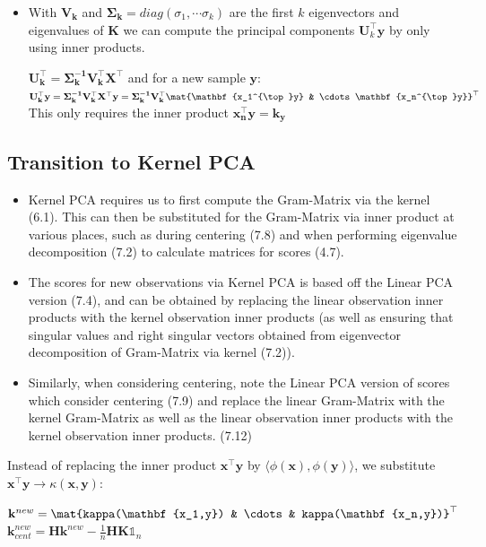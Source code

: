 \documentclass[english]{latex4ei/latex4ei_sheet}
\begin{document}
\begin{sectionbox}
\begin{itemize}
\begin{emphbox}
\end{emphbox}
\item With $\mathbf{V_k}$ and $\mathbf{\Sigma_k}=diag(\sigma_1, \cdots\sigma_k)$ are the first $k$ eigenvectors and eigenvalues of $\mathbf{K}$ we can compute the principal components $\mathbf{U}^{\top}_k\mathbf{y}$ by only using inner products.
\begin{emphbox}
    $\mathbf{U_k^{\top}}=\mathbf{\Sigma_k^{-1}V_k^{\top}X^{\top}}$ and for a new sample $\mathbf{y}$:\\
    $\mathbf{U_k^{\top}y}=\mathbf{\Sigma_k^{-1}V_k^{\top}X^{\top}y}=\mathbf{\Sigma_k^{-1}V_k^{\top}}\mat{\mathbf{x_1^{\top}y} & \cdots \mathbf{x_n^{\top}y}}^{\top}$\\
    This only requires the inner product $\mathbf{x_n^{\top}y=k_y}$
\end{emphbox}
\end{itemize}

\subsection{Transition to Kernel PCA}
\begin{itemize}
\item Kernel PCA requires us to first compute the Gram-Matrix via the kernel (6.1). This can then be substituted for the Gram-Matrix via inner product at various places, such as during centering (7.8) and when performing eigenvalue decomposition (7.2) to calculate matrices for scores (4.7).
\item The scores for new observations via Kernel PCA is based off the Linear PCA version (7.4), and can be obtained by replacing the linear observation inner products with the kernel observation inner products (as well as ensuring that singular values and right singular vectors obtained from eigenvector decomposition of Gram-Matrix via kernel (7.2)).
\item Similarly, when considering centering, note the Linear PCA version of scores which consider centering (7.9) and replace the linear Gram-Matrix with the kernel Gram-Matrix as well as the linear observation inner products with the kernel observation inner products. (7.12)
\end{itemize}
Instead of replacing the inner product $\mathbf{x^{\top}y}$ by $\langle\phi(\mathbf{x}),\phi(\mathbf{y})\rangle$, we substitute $\mathbf{x^{\top}y}\rightarrow\kappa(\mathbf{x,y})$:
\begin{emphbox}
    $\mathbf{k}^{new}=\mat{kappa(\mathbf{x_1,y}) & \cdots & kappa(\mathbf{x_n,y})}^{\top}$\\
    $\mathbf{k}_{cent}^{new}=\mathbf{Hk}_{}^{new}-\frac{1}{n}\mathbf{HK}\mathds{1}_n$
\end{emphbox}
\end{sectionbox}
\end{document}
